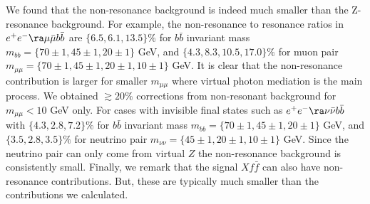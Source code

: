 \documentclass[11pt]{article}
\begin{document}
We found that the non-resonance background is indeed much smaller than the
Z-resonance background. For example, the non-resonance to resonance ratios in $e^+e^-\ra \mu \bar{\mu} b\bar{b}$ are
$\{6.5,6.1,13.5\}\%$ for $b\bar{b}$ invariant mass $m_{bb}=\{70\pm1, 45\pm 1, 20\pm1 \}$ GeV, and
$\{4.3, 8.3, 10.5, 17.0\}\%$ for muon pair $m_{\mu\mu}=\{70\pm1, 45\pm 1, 20\pm1, 10\pm1 \}$ GeV.
It is clear that the non-resonance contribution is larger for smaller $m_{\mu\mu}$ where virtual photon mediation is the main process. We obtained $\gtrsim 20\%$ corrections from non-resonant background for $m_{\mu\mu}<10$ GeV only.
For cases with invisible final states such as   $e^+e^-\ra \nu \bar{\nu} b\bar{b}$
with  $\{4.3,2.8,7.2\}\%$ for $b\bar{b}$ invariant mass $m_{bb}=\{70\pm1, 45\pm 1, 20\pm1 \}$ GeV,
and $\{3.5, 2.8, 3.5\}\%$ for neutrino pair $m_{\nu\nu}=\{ 45\pm 1, 20\pm1, 10\pm1 \}$ GeV.
Since the neutrino pair can only come from virtual $Z$ the non-resonance background is consistently small.
Finally, we remark that the signal $X f\bar{f}$ can also have non-resonance contributions. But, these are typically much smaller than the contributions we calculated.
\end{document}
